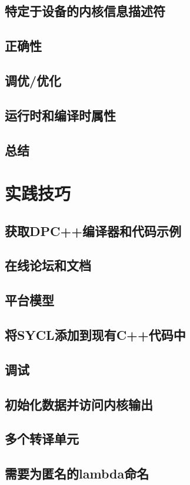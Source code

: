 \documentclass[11pt,a4paper,UTF8]{ctexart}
\begin{document}
		\subsection{特定于设备的内核信息描述符}
		\subsection{正确性}
		\subsection{调优/优化}
		\subsection{运行时和编译时属性}
		\subsection{总结}
	\section{实践技巧}
		\subsection{获取DPC++编译器和代码示例}
		\subsection{在线论坛和文档}
		\subsection{平台模型}
		\subsection{将SYCL添加到现有C++代码中}
		\subsection{调试}
		\subsection{初始化数据并访问内核输出}
		\subsection{多个转译单元}
		\subsection{需要为匿名的lambda命名}
\end{document}
